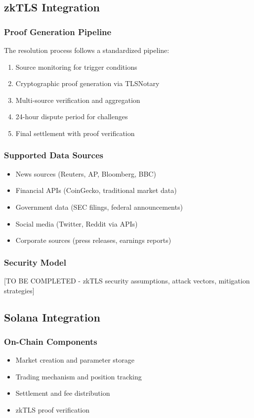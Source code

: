 \documentclass[11pt,a4paper]{article}
\begin{document}
\subsection{zkTLS Integration}

\subsubsection{Proof Generation Pipeline}
The resolution process follows a standardized pipeline:
\begin{enumerate}
    \item Source monitoring for trigger conditions
    \item Cryptographic proof generation via TLSNotary
    \item Multi-source verification and aggregation
    \item 24-hour dispute period for challenges
    \item Final settlement with proof verification
\end{enumerate}

\subsubsection{Supported Data Sources}
\begin{itemize}
    \item News sources (Reuters, AP, Bloomberg, BBC)
    \item Financial APIs (CoinGecko, traditional market data)
    \item Government data (SEC filings, federal announcements)
    \item Social media (Twitter, Reddit via APIs)
    \item Corporate sources (press releases, earnings reports)
\end{itemize}

\subsubsection{Security Model}
[TO BE COMPLETED - zkTLS security assumptions, attack vectors, mitigation strategies]

\subsection{Solana Integration}

\subsubsection{On-Chain Components}
\begin{itemize}
    \item Market creation and parameter storage
    \item Trading mechanism and position tracking
    \item Settlement and fee distribution
    \item zkTLS proof verification
\end{itemize}
\end{document}
